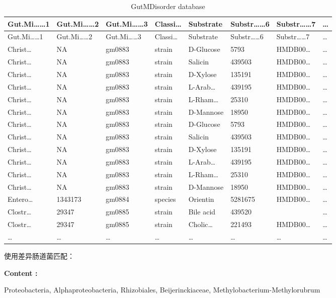 \documentclass[
]{article}
\begin{document}
\begin{longtable}[]{@{}llllllll@{}}
\caption{\label{tab:GutMDisorder-database}GutMDisorder database}\tabularnewline
\toprule
Gut.Mi\ldots\ldots1 & Gut.Mi\ldots\ldots2 & Gut.Mi\ldots\ldots3 & Classi\ldots{} & Substrate & Substr\ldots\ldots6 & Substr\ldots\ldots7 & \ldots{}\tabularnewline
\midrule
\endfirsthead
\toprule
Gut.Mi\ldots\ldots1 & Gut.Mi\ldots\ldots2 & Gut.Mi\ldots\ldots3 & Classi\ldots{} & Substrate & Substr\ldots\ldots6 & Substr\ldots\ldots7 & \ldots{}\tabularnewline
\midrule
\endhead
Christ\ldots{} & NA & gm0883 & strain & D-Glucose & 5793 & HMDB00\ldots{} & \ldots{}\tabularnewline
Christ\ldots{} & NA & gm0883 & strain & Salicin & 439503 & HMDB00\ldots{} & \ldots{}\tabularnewline
Christ\ldots{} & NA & gm0883 & strain & D-Xylose & 135191 & HMDB00\ldots{} & \ldots{}\tabularnewline
Christ\ldots{} & NA & gm0883 & strain & L-Arab\ldots{} & 439195 & HMDB00\ldots{} & \ldots{}\tabularnewline
Christ\ldots{} & NA & gm0883 & strain & L-Rham\ldots{} & 25310 & HMDB00\ldots{} & \ldots{}\tabularnewline
Christ\ldots{} & NA & gm0883 & strain & D-Mannose & 18950 & HMDB00\ldots{} & \ldots{}\tabularnewline
Christ\ldots{} & NA & gm0883 & strain & D-Glucose & 5793 & HMDB00\ldots{} & \ldots{}\tabularnewline
Christ\ldots{} & NA & gm0883 & strain & Salicin & 439503 & HMDB00\ldots{} & \ldots{}\tabularnewline
Christ\ldots{} & NA & gm0883 & strain & D-Xylose & 135191 & HMDB00\ldots{} & \ldots{}\tabularnewline
Christ\ldots{} & NA & gm0883 & strain & L-Arab\ldots{} & 439195 & HMDB00\ldots{} & \ldots{}\tabularnewline
Christ\ldots{} & NA & gm0883 & strain & L-Rham\ldots{} & 25310 & HMDB00\ldots{} & \ldots{}\tabularnewline
Christ\ldots{} & NA & gm0883 & strain & D-Mannose & 18950 & HMDB00\ldots{} & \ldots{}\tabularnewline
Entero\ldots{} & 1343173 & gm0884 & species & Orientin & 5281675 & HMDB00\ldots{} & \ldots{}\tabularnewline
Clostr\ldots{} & 29347 & gm0885 & strain & Bile acid & 439520 & & \ldots{}\tabularnewline
Clostr\ldots{} & 29347 & gm0885 & strain & Cholic\ldots{} & 221493 & HMDB00\ldots{} & \ldots{}\tabularnewline
\ldots{} & \ldots{} & \ldots{} & \ldots{} & \ldots{} & \ldots{} & \ldots{} & \ldots{}\tabularnewline
\bottomrule
\end{longtable}

使用差异肠道菌匹配：

\begin{center}\begin{tcolorbox}[colback=gray!10, colframe=gray!50, width=0.9\linewidth, arc=1mm, boxrule=0.5pt]
\textbf{
Content
:}

\vspace{0.5em}

    Proteobacteria, Alphaproteobacteria, Rhizobiales,
Beijerinckiaceae, Methylobacterium-Methylorubrum

\vspace{2em}
\end{tcolorbox}
\end{center}
\end{document}

